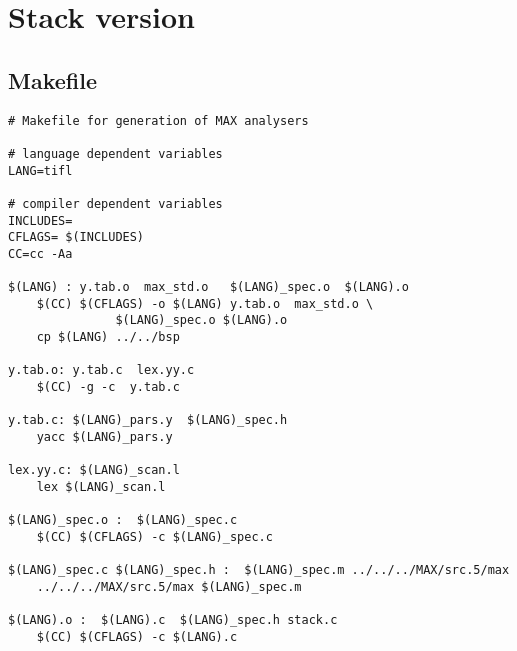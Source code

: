 \section{Stack version}
\subsection{Makefile}
\begin{verbatim}
# Makefile for generation of MAX analysers 

# language dependent variables
LANG=tifl

# compiler dependent variables
INCLUDES=
CFLAGS= $(INCLUDES)
CC=cc -Aa 

$(LANG) : y.tab.o  max_std.o   $(LANG)_spec.o  $(LANG).o 
	$(CC) $(CFLAGS) -o $(LANG) y.tab.o  max_std.o \
			   $(LANG)_spec.o $(LANG).o 
	cp $(LANG) ../../bsp

y.tab.o: y.tab.c  lex.yy.c 
	$(CC) -g -c  y.tab.c

y.tab.c: $(LANG)_pars.y  $(LANG)_spec.h
	yacc $(LANG)_pars.y	

lex.yy.c: $(LANG)_scan.l 
	lex $(LANG)_scan.l 	

$(LANG)_spec.o :  $(LANG)_spec.c
	$(CC) $(CFLAGS) -c $(LANG)_spec.c

$(LANG)_spec.c $(LANG)_spec.h :  $(LANG)_spec.m ../../../MAX/src.5/max
	../../../MAX/src.5/max $(LANG)_spec.m

$(LANG).o :  $(LANG).c  $(LANG)_spec.h stack.c 
	$(CC) $(CFLAGS) -c $(LANG).c

\end{verbatim}

